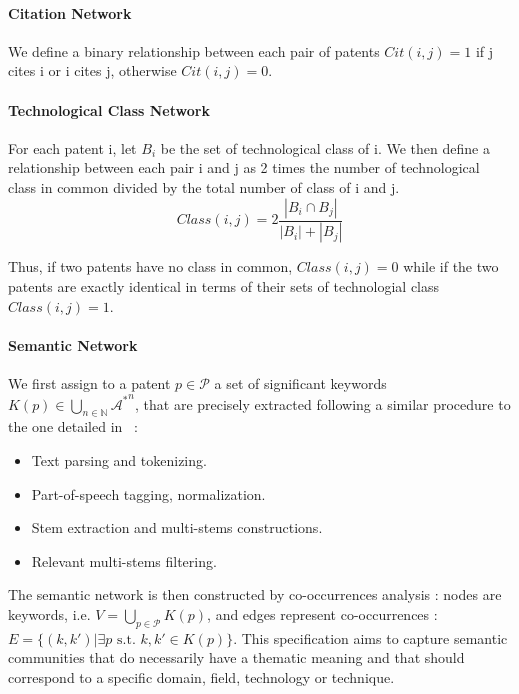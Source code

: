 \paragraph{Citation Network}

We define a binary relationship between each pair of patents $Cit(i, j) = 1$ if j cites i or i cites j, otherwise $Cit(i, j) = 0$. 

\paragraph{Technological Class Network}

For each patent i, let $B_i$ be the set of technological class of i. We then define a relationship between each pair i and j as 2 times the number of technological class in common divided by the total number of class of i and j. 
\[
Class(i,j) = 2\frac{\left\vert{B_i\cap B_j}\right\vert}{\left\vert{B_i}\right\vert+\left\vert{B_j}\right\vert}
\]

Thus, if two patents have no class in common, $Class(i,j)=0$ while if the two patents are exactly identical in terms of their sets of technologial class $Class(i,j)=1$.

\paragraph{Semantic Network}

We first assign to a patent $p\in \mathcal{P}$ a set of significant keywords $K(p)\in \bigcup_{n\in \mathbb{N}} {\mathcal{A}^{\ast}}^n$, that are precisely extracted following a similar procedure to the one detailed in~\cite{chavalarias2013phylomemetic} :
\begin{itemize}
\item Text parsing and tokenizing.
\item Part-of-speech tagging, normalization.
\item Stem extraction and multi-stems constructions.
\item Relevant multi-stems filtering.
\end{itemize}

The semantic network is then constructed by co-occurrences analysis : nodes are keywords, i.e. $V=\bigcup_{p\in\mathcal{P}}K(p)$, and edges represent co-occurrences : $E = \{(k,k') | \exists p \textrm{ s.t. } k, k' \in K(p)\}$. This specification aims to capture semantic communities that do necessarily have a thematic meaning and that should correspond to a specific domain, field, technology or technique.

